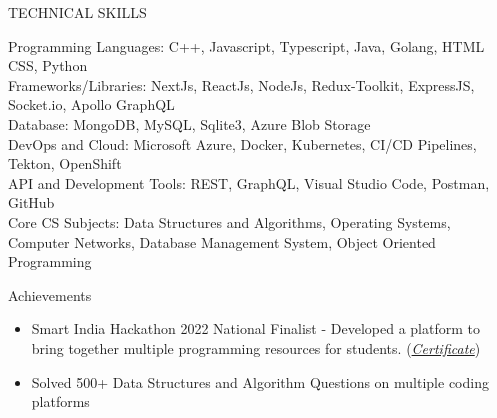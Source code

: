 \documentclass{resume} %
\begin{document}
\begin{rSection}{TECHNICAL SKILLS}




Programming Languages: {\normalfont C++, Javascript, Typescript, Java, Golang, HTML CSS, Python}
\\
Frameworks/Libraries: {\normalfont NextJs, ReactJs, NodeJs, Redux-Toolkit, ExpressJS,  Socket.io, Apollo GraphQL}
 \\
 Database: {\normalfont MongoDB, MySQL, Sqlite3, Azure Blob Storage}
 \\
 DevOps and Cloud: {\normalfont Microsoft Azure, Docker, Kubernetes, CI/CD Pipelines, Tekton, OpenShift}
 \\
 API and Development Tools: {\normalfont REST, GraphQL, Visual Studio Code, Postman, GitHub}
 \\
 Core CS Subjects: {\normalfont Data Structures and Algorithms, Operating Systems, Computer Networks, Database Management System, Object Oriented Programming}

\end{rSection}


\begin{rSection}{Achievements}

\begin{itemize}
   \item {Smart India Hackathon 2022 National Finalist} - {\normalfont Developed a platform to bring together multiple programming resources for students. }{\normalfont (\href{https://drive.google.com/file/d/1No-u1sUaclG-nf7_Gtym5JDEz1ydyRSL/view?usp=sharing}{\emph{Certificate}})}
    \item { {\normalfont Solved} 500+ {\normalfont Data Structures and Algorithm Questions on multiple coding platforms}  }
\end{itemize}
\end{rSection}






\end{document}
